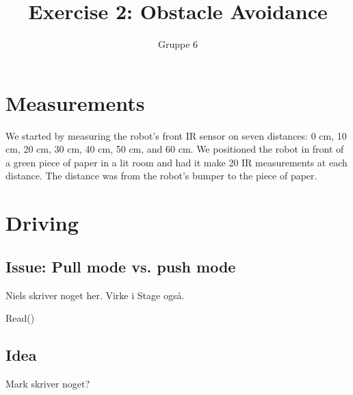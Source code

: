 \documentclass[a4paper,12pt]{article}
\title{Exercise 2: Obstacle Avoidance}
\author{Gruppe 6}
\begin{document}
\maketitle

\section{Measurements}

We started by measuring the robot's front IR sensor on seven distances: 0 cm, 10
cm, 20 cm, 30 cm, 40 cm, 50 cm, and 60 cm.  We positioned the robot in front of
a green piece of paper in a lit room and had it make 20 IR measurements at each
distance.  The distance was from the robot's bumper to the piece of paper.


\section{Driving}

\subsection{Issue: Pull mode vs. push mode}

Niels skriver noget her.  Virke i Stage også.

Read()

\subsection{Idea}

Mark skriver noget?
\end{document}
